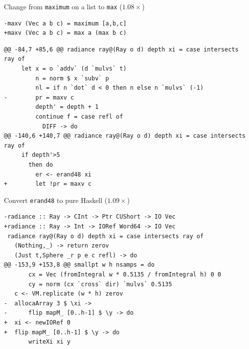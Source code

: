 \documentclass[8pt]{beamer}
\begin{document}

\begin{frame}[fragile]{Change from \texttt{maximum} on a list to \texttt{max} ($1.08\times$)}
\begin{verbatim}
-maxv (Vec a b c) = maximum [a,b,c]
+maxv (Vec a b c) = max a (max b c)
\end{verbatim}

\begin{verbatim}
@@ -84,7 +85,6 @@ radiance ray@(Ray o d) depth xi = case intersects ray of
     let x = o `addv` (d `mulvs` t)
         n = norm $ x `subv` p
         nl = if n `dot` d < 0 then n else n `mulvs` (-1)
-        pr = maxv c
         depth' = depth + 1
         continue f = case refl of
           DIFF -> do
@@ -140,6 +140,7 @@ radiance ray@(Ray o d) depth xi = case intersects ray of
     if depth'>5
       then do
         er <- erand48 xi
+        let !pr = maxv c
\end{verbatim}

\end{frame}



\begin{frame}[fragile]{Convert \texttt{erand48} to pure Haskell ($1.09\times$)}
\begin{verbatim}
-radiance :: Ray -> CInt -> Ptr CUShort -> IO Vec
+radiance :: Ray -> Int -> IORef Word64 -> IO Vec
 radiance ray@(Ray o d) depth xi = case intersects ray of
   (Nothing,_) -> return zerov
   (Just t,Sphere _r p e c refl) -> do
@@ -153,9 +153,8 @@ smallpt w h nsamps = do
       cx = Vec (fromIntegral w * 0.5135 / fromIntegral h) 0 0
       cy = norm (cx `cross` dir) `mulvs` 0.5135
   c <- VM.replicate (w * h) zerov
-  allocaArray 3 $ \xi ->
-      flip mapM_ [0..h-1] $ \y -> do
+  xi <- newIORef 0
+  flip mapM_ [0..h-1] $ \y -> do
       writeXi xi y
\end{verbatim}
\end{frame}
\end{document}

